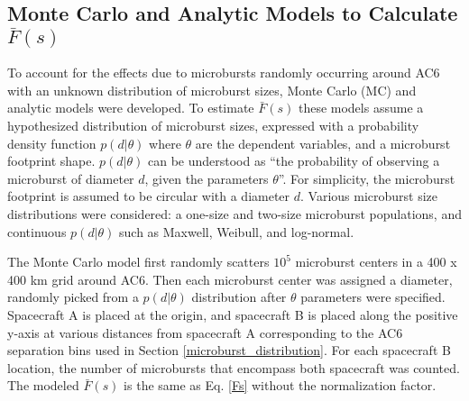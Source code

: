 \documentclass[draft]{agujournal2019}
\begin{document}
\subsection{Monte Carlo and Analytic Models to Calculate $\bar{F}(s)$}

To account for the effects due to microbursts randomly occurring around AC6 with an unknown distribution of microburst sizes, Monte Carlo (MC) and analytic models were developed. To estimate $\bar{F}(s)$ these models assume a hypothesized distribution of microburst sizes, expressed with a probability density function $p(d | \theta)$ where $\theta$ are the dependent variables, and a microburst footprint shape. $p(d | \theta)$ can be understood as ``the probability of observing a microburst of diameter $d$, given the parameters $\theta$''. For simplicity, the microburst footprint is assumed to be circular with a diameter $d$. Various microburst size distributions were considered: a one-size and two-size microburst populations, and continuous $p(d | \theta)$ such as Maxwell, Weibull, and log-normal.

The Monte Carlo model first randomly scatters $10^5$ microburst centers in a 400 x 400 km grid around AC6. Then each microburst center was assigned a diameter, randomly picked from a $p(d | \theta)$ distribution after $\theta$ parameters were specified. Spacecraft A is placed at the origin, and spacecraft B is placed along the positive y-axis at various distances from spacecraft A corresponding to the AC6 separation bins used in Section \ref{microburst_distribution}. For each spacecraft B location, the number of microbursts that encompass both spacecraft was counted. The modeled $\bar{F}(s)$ is the same as Eq. \ref{Fs} without the normalization factor.
\end{document}
